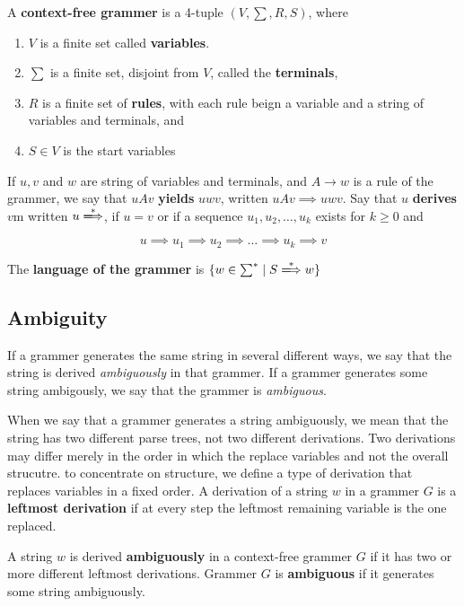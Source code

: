 \begin{defination}
    A \textbf{context-free grammer} is a 4-tuple $(V, \sum, R, S)$, where
    \begin{enumerate}
        \item $V$ is a finite set called \textbf{variables}.
        \item $\sum$ is a finite set, disjoint from $V$, called the \textbf{terminals},
        \item $R$ is a finite set of \textbf{rules}, with each rule beign
            a variable and a string of variables and terminals, and
        \item $S \in V$ is the start variables
    \end{enumerate}
\end{defination}

If $u, v$ and $w$ are string of variables and terminals, and $A \rightarrow w$
is a rule of the grammer, we say that $uAv$ \textbf{yields} $uwv$, written
$uAv \implies uwv$. Say that $u$ \textbf{derives} $v$m written
$u \derives$, if $u = v$ or if a sequence $u_1, u_2, \dots, u_k$ exists for
$k \ge 0$ and 

$$
u \implies u_1 \implies u_2 \implies \dots \implies u_k \implies v
$$

The \textbf{language of the grammer} is $\{w \in \sum^{*} \mid S \derives w\}$

\subsection{Ambiguity}

If a grammer generates the same string in several different ways, we say that
the string is derived \textit{ambiguously} in that grammer. If a grammer 
generates some string ambigously, we say that the grammer is \textit{ambiguous}.

When we say that a grammer generates a string ambiguously, we mean that
the string has two different parse trees, not two different derivations. 
Two derivations may differ merely in the order in which the replace variables
and not the overall strucutre. to concentrate on structure, we define a type of
derivation that replaces variables in a fixed order. A derivation of a string
$w$ in a grammer $G$ is a \textbf{leftmost derivation} if at every step the
leftmost remaining variable is the one replaced.

\begin{defination}
    A string $w$ is derived \textbf{ambiguously} in a context-free grammer $G$
    if it has two or more different leftmost derivations. Grammer $G$ is 
    \textbf{ambiguous} if it generates some string ambiguously.
\end{defination}

